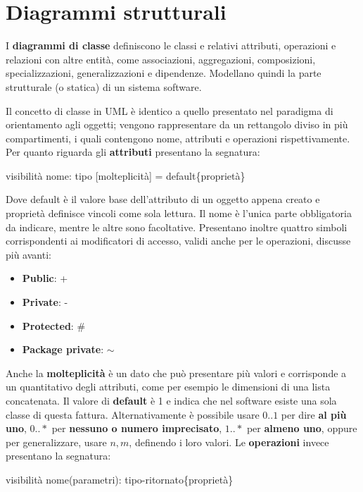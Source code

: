 \section{Diagrammi strutturali}
I \textbf{diagrammi di classe} definiscono le classi e relativi attributi, operazioni e relazioni con altre entità, come associazioni, aggregazioni,
composizioni, specializzazioni, generalizzazioni e dipendenze. Modellano quindi la parte strutturale (o statica) di un sistema software.\par
Il concetto di classe in UML è identico a quello presentato nel paradigma di orientamento agli oggetti; vengono rappresentare da un rettangolo diviso in
più compartimenti, i quali contengono nome, attributi e operazioni rispettivamente. Per quanto riguarda gli \textbf{attributi} presentano la segnatura:
\begin{center}
	visibilità nome: tipo [molteplicità] = default\{proprietà\}
\end{center}
\noindent Dove default è il valore base dell'attributo di un oggetto appena creato e proprietà definisce vincoli come sola lettura. Il nome è l'unica
parte obbligatoria da indicare, mentre le altre sono facoltative. Presentano inoltre quattro simboli corrispondenti ai modificatori di accesso, validi
anche per le operazioni, discusse più avanti: \begin{itemize}
	\item \textbf{Public}: +
	\item \textbf{Private}: -
	\item \textbf{Protected}: \#
	\item \textbf{Package private}: $\sim$
\end{itemize}
\noindent Anche la \textbf{molteplicità} è un dato che può presentare più valori e corrisponde a un quantitativo degli attributi, come per esempio le
dimensioni di una lista concatenata. Il valore di \textbf{default} è 1 e indica che nel software esiste una sola classe di questa fattura.
Alternativamente è possibile usare $0..1$ per dire \textbf{al più uno}, $0..*$ per \textbf{nessuno o numero imprecisato}, $1..*$ per \textbf{almeno uno},
oppure per generalizzare, usare $n,m$, definendo i loro valori. Le \textbf{operazioni} invece presentano la segnatura: \begin{center}
	visibilità nome(parametri): tipo-ritornato\{proprietà\}
\end{center}

